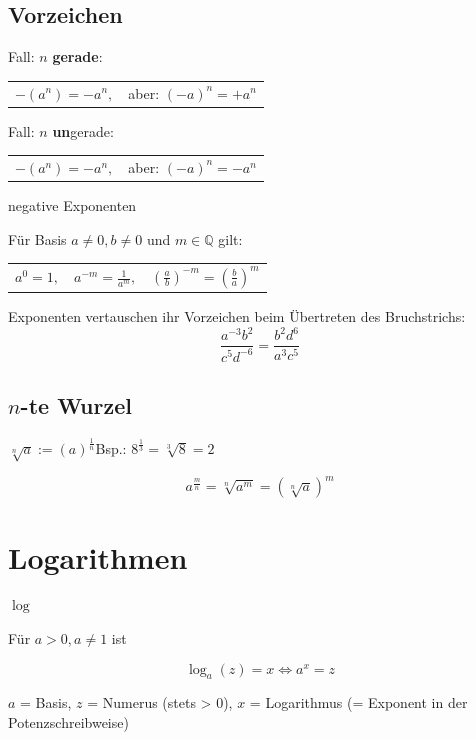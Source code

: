 \begin{multicols}{2}
\subsection*{Vorzeichen}
Fall: $n$ \textbf{gerade}:

\begin{tabular}{cc}
 $-(a^n) = -a^n,$ & aber: $(-a)^n = +a^n$\\
 \end{tabular} 

Fall: $n$ \textbf{un}gerade:

\begin{tabular}{cc}
 $-(a^n) = -a^n,$ & aber: $(-a)^n = -a^n$\\
 \end{tabular} 


\begin{gesetz*}{negative Exponenten}{}

Für Basis $a\ne 0, b\ne 0$ und $m \in\mathbb{Q}$ gilt:

\begin{tabular}{ccc}
$a^0=1,$ & $a^{-m} = \frac1{a^m},$ & $\left(\frac{a}b\right)^{-m} = \left(\frac{b}a\right)^m$ \\
 \end{tabular}
\end{gesetz*}

\begin{rezept*}{}{}{}
Exponenten vertauschen ihr Vorzeichen beim Übertreten des Bruchstrichs:
$$\frac{a^{-3}b^2}{c^5d^{-6}} = \frac{b^2d^6}{a^3c^5}$$
\end{rezept*}

\subsection*{$n$-te Wurzel}
$\sqrt[n]{a} := \left(a\right)^\frac1n$\hfill{}Bsp.: $8^{\frac13}=\sqrt[3]{8}=2$
\begin{gesetz*}{}{}
$$a^{\frac{m}n} = \sqrt[n]{a^m} = \left(\sqrt[n]a\right)^m$$
\end{gesetz*}%

\hrulefill
\section*{Logarithmen}

\begin{definition*}{$\log$}{}

Für $a>0, a\ne 1$ ist

$$\log_a{}(z)=x \Longleftrightarrow{} a^x = z$$
\end{definition*}
$a$ = Basis, $z$ = Numerus (stets > 0), $x$ = Logarithmus (= Exponent in der Potenzschreibweise)


\end{multicols}
